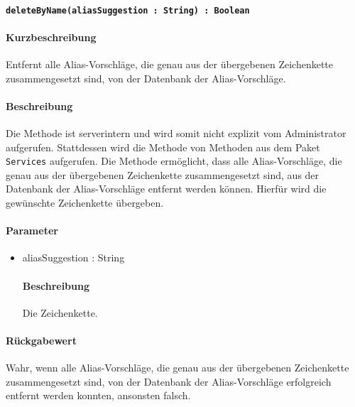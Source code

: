 \paragraph{\texttt{deleteByName(aliasSuggestion : String) : Boolean}}%
\paragraph*{Kurzbeschreibung}
Entfernt alle Alias-Vorschläge, die genau aus der übergebenen Zeichenkette zusammengesetzt sind, von der Datenbank der Alias-Vorschläge.
\paragraph*{Beschreibung}
Die Methode ist serverintern und wird somit nicht explizit vom Administrator aufgerufen.
Stattdessen wird die Methode von Methoden aus dem Paket \texttt{Services} aufgerufen.
Die Methode ermöglicht, dass alle Alias-Vorschläge, die genau aus der übergebenen Zeichenkette zusammengesetzt sind, aus der Datenbank der Alias-Vorschläge entfernt werden können.
Hierfür wird die gewünschte Zeichenkette übergeben.
\paragraph*{Parameter}
\begin{itemize}
    \item aliasSuggestion : String
    		\paragraph*{Beschreibung}
    		Die Zeichenkette.
\end{itemize}
\paragraph*{Rückgabewert}
Wahr, wenn alle Alias-Vorschläge, die genau aus der übergebenen Zeichenkette zusammengesetzt sind, von der Datenbank der Alias-Vorschläge erfolgreich entfernt werden konnten, ansonsten falsch.
